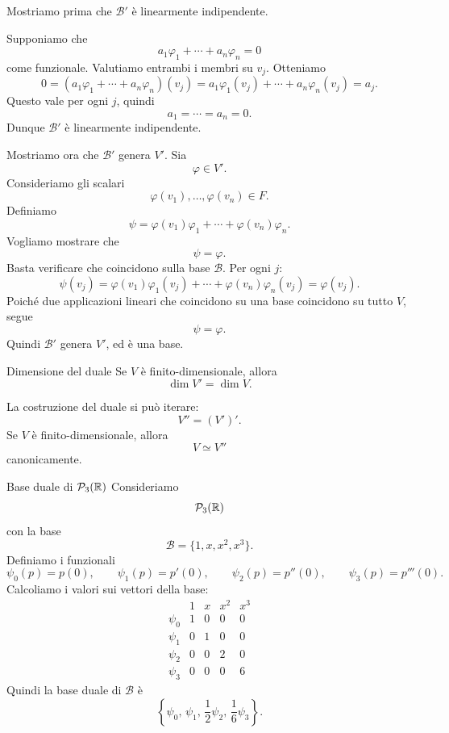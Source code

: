 \documentclass[a4paper]{article}
\begin{document}
\begin{snippetproof}{}
    Mostriamo prima che \(\mathcal{B}'\) è linearmente indipendente.

    Supponiamo che
    \[
        a_1\varphi_1+\cdots+a_n\varphi_n=0
    \]
    come funzionale. Valutiamo entrambi i membri su \(v_j\). Otteniamo
    \[
        0
        =
        (a_1\varphi_1+\cdots+a_n\varphi_n)(v_j)
        =
        a_1\varphi_1(v_j)+\cdots+a_n\varphi_n(v_j)
        =
        a_j.
    \]
    Questo vale per ogni \(j\), quindi
    \[
        a_1=\cdots=a_n=0.
    \]
    Dunque \(\mathcal{B}'\) è linearmente indipendente.

    Mostriamo ora che \(\mathcal{B}'\) genera \(V'\). Sia
    \[
        \varphi\in V'.
    \]
    Consideriamo gli scalari
    \[
        \varphi(v_1),\ldots,\varphi(v_n)\in F.
    \]
    Definiamo
    \[
        \psi
        =
        \varphi(v_1)\varphi_1+\cdots+\varphi(v_n)\varphi_n.
    \]
    Vogliamo mostrare che
    \[
        \psi=\varphi.
    \]
    Basta verificare che coincidono sulla base \(\mathcal{B}\). Per ogni \(j\):
    \[
        \psi(v_j)
        =
        \varphi(v_1)\varphi_1(v_j)+\cdots+\varphi(v_n)\varphi_n(v_j)
        =
        \varphi(v_j).
    \]
    Poiché due applicazioni lineari che coincidono su una base coincidono su tutto \(V\), segue
    \[
        \psi=\varphi.
    \]
    Quindi \(\mathcal{B}'\) genera \(V'\), ed è una base.
\end{snippetproof}

\begin{snippetcorollary}{Dimensione del duale}
    Se \(V\) è finito-dimensionale, allora
    \[
        \dim V'=\dim V.
    \]
\end{snippetcorollary}

La costruzione del duale si può iterare:
\[
    V''=(V')'.
\]
Se \(V\) è finito-dimensionale, allora
\[
    V\simeq V''
\]
canonicamente.

\begin{snippetexample}{Base duale di \(\mathcal{P}_3(\mathbb{R})\)}
    Consideriamo
    \[
        \mathcal{P}_3(\mathbb{R})
    \]
    con la base
    \[
        \mathcal{B}=\{1,x,x^2,x^3\}.
    \]
    Definiamo i funzionali
    \[
        \psi_0(p)=p(0),
        \qquad
        \psi_1(p)=p'(0),
        \qquad
        \psi_2(p)=p''(0),
        \qquad
        \psi_3(p)=p'''(0).
    \]
    Calcoliamo i valori sui vettori della base:
    \[
        \begin{array}{c|cccc}
            & 1 & x & x^2 & x^3\\
            \hline
            \psi_0 & 1 & 0 & 0 & 0\\
            \psi_1 & 0 & 1 & 0 & 0\\
            \psi_2 & 0 & 0 & 2 & 0\\
            \psi_3 & 0 & 0 & 0 & 6
        \end{array}
    \]
    Quindi la base duale di \(\mathcal{B}\) è
    \[
        \left\{
            \psi_0,\,
            \psi_1,\,
            \frac{1}{2}\psi_2,\,
            \frac{1}{6}\psi_3
        \right\}.
    \]
\end{snippetexample}
\end{document}
